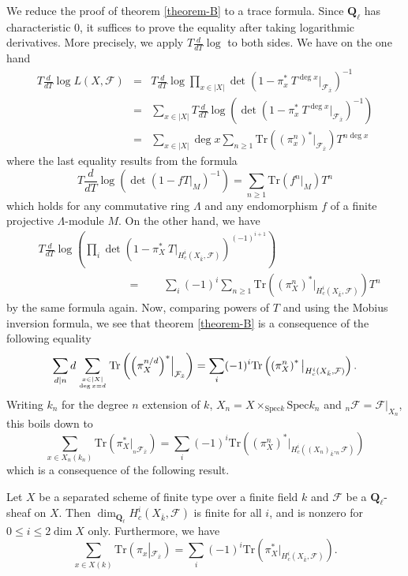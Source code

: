 \noindent
We reduce the proof of theorem \ref{theorem-B} to a trace formula. Since
$\mathbf{Q}_\ell$ has characteristic 0, it suffices to prove the equality after
taking logarithmic derivatives. More precisely, we apply $T\frac{d}{dT} \log $
to both sides. We have on the one hand
\begin{eqnarray*}
T\frac{d}{dT}\log L(X, \mathcal{F}) & = &
T\frac{d}{dT} \log \prod_{x\in |X|} \det\left(1-\pi_x^*\ T^{\deg
x}\Big|_{\mathcal{F}_{\bar x}}\right)^{-1}\\
& = & \sum_{x\in |X|} T\frac{d}{dT} \log \left( \det\left(1-\pi_x^*\ T^{\deg
x}\Big|_{\mathcal{F}_{\bar x}}\right)^{-1}\right) \\
&= & \sum_{x \in |X|} \deg x\sum_{n \geq 1}
\text{Tr}\left({\left(\pi_x^n\right)}^*\big|_{\mathcal{F}_{\bar x}}\right)
T^{n\deg x}
\end{eqnarray*}
where the last equality results from the formula
$$
T\frac{d}{dT}\log\left(\det\left(1-fT|_M\right)^{-1}\right) = \sum_{n\geq 1}
\text{Tr}(f^n|_M)T^n
$$
which holds for any commutative ring $\Lambda$ and any endomorphism $f$ of a
finite projective $\Lambda$-module $M$. On the other hand, we have
\begin{align*}
&T\frac{d}{dT} \log\left(\prod_i \det\left(1-\pi_X^*\
T\Big|_{H_c^i\left(X_{\bar k} , \mathcal{F}\right)}\right)^{(-1)^{i+1}}\right)
\\
&\qquad\qquad\qquad \qquad = \qquad
\sum_i (-1)^i \sum_{n\geq 1}
\text{Tr}\left({\left(\pi_X^n\right)}^*\big|_{H_c^i(X_{\bar k},
\mathcal{F})}\right) T^n
\end{align*}
by the same formula again. Now, comparing powers of $T$ and using the Mobius
inversion formula, we see that theorem \ref{theorem-B} is a consequence of the
following equality
$$
\sum_{d | n} d \sum_{x\in |X| \atop \deg x = d} \text{Tr} \left( {\left(
\pi_X^{n/d} \right)}^* \Big|_{\mathcal{F}_{\bar x}} \right)
=
\sum_i (-1)^i \text{Tr}\left(\left(\pi^n_X\right)^*\big|_{H^i_c(X_{\bar k},
\mathcal{F})} \right).
$$
Writing $k_n$ for the degree $n$ extension of $k$, $X_n = X \times_{\text{Spec}
k} \text{Spec} k_n$ and $_n \mathcal{F} = \mathcal{F}|_{X_n}$, this boils down
to
$$
\sum_{x \in X_n(k_n)} \text{Tr}\left( \pi_X^*\big|_{_n\mathcal{F}_{\bar x}}
\right)
=
\sum_i (-1)^i \text{Tr}\left(\left(\pi^n_X\right)^*\big|_{H^i_c({(X_n)}_{\bar
k}, _n\mathcal{F})} \right)
$$
which is a consequence of the following result.


\begin{theorem}
\label{theorem-C}
Let $X$ be a separated scheme of finite type over a finite field $k$ and
$\mathcal{F}$ be a $\mathbf{Q}_\ell$-sheaf on $X$. Then
$\dim_{\mathbf{Q}_\ell}H_c^i(X_{\bar k}, \mathcal{F})$ is finite for all $i$,
and is nonzero for $0\leq i \leq 2 \dim X$ only. Furthermore, we have
$$
\sum_{x\in X(k)} \text{Tr}\left(\pi_x\left|_{\mathcal{F}_{\bar
x}}\right.\right) = \sum_i (-1)^i\text{Tr}\left(\pi_X^*\big|_{H_c^i(X_{\bar k},
\mathcal{F})}\right).
$$
\end{theorem}

